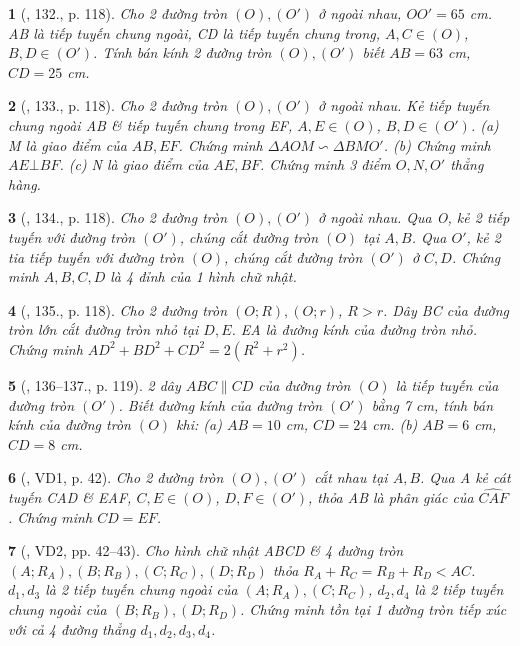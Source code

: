 \documentclass{article}
\newtheorem{baitoan}{}
\begin{document}
\begin{baitoan}[\cite{Binh_Toan_9_tap_1}, 132., p. 118]
	Cho 2 đường tròn $(O),(O')$ ở ngoài nhau, $OO' = 65$ {\rm cm}. AB là tiếp tuyến chung ngoài, CD là tiếp tuyến chung trong, $A,C\in(O)$, $B,D\in(O')$. Tính bán kính 2 đường tròn $(O),(O')$ biết $AB = 63$ {\rm cm}, $CD = 25$ {\rm cm}.
\end{baitoan}

\begin{baitoan}[\cite{Binh_Toan_9_tap_1}, 133., p. 118]
	Cho 2 đường tròn $(O),(O')$ ở ngoài nhau. Kẻ tiếp tuyến chung ngoài AB \& tiếp tuyến chung trong EF, $A,E\in(O)$, $B,D\in(O')$. (a) M là giao điểm của $AB,EF$. Chứng minh $\Delta AOM\backsim\Delta BMO'$. (b) Chứng minh $AE\bot BF$. (c) N là giao điểm của $AE,BF$. Chứng minh 3 điểm $O,N,O'$ thẳng hàng.
\end{baitoan}

\begin{baitoan}[\cite{Binh_Toan_9_tap_1}, 134., p. 118]
	Cho 2 đường tròn $(O),(O')$ ở ngoài nhau. Qua O, kẻ 2 tiếp tuyến với đường tròn $(O')$, chúng cắt đường tròn $(O)$ tại $A,B$. Qua $O'$, kẻ 2 tia tiếp tuyến với đường tròn $(O)$, chúng cắt đường tròn $(O')$ ở $C,D$. Chứng minh $A,B,C,D$ là 4 đỉnh của 1 hình chữ nhật.
\end{baitoan}

\begin{baitoan}[\cite{Binh_Toan_9_tap_1}, 135., p. 118]
	Cho 2 đường tròn $(O;R),(O;r)$, $R > r$. Dây BC của đường tròn lớn cắt đường tròn nhỏ tại $D,E$. EA là đường kính của đường tròn nhỏ. Chứng minh $AD^2 + BD^2 + CD^2 = 2(R^2 + r^2)$.
\end{baitoan}

\begin{baitoan}[\cite{Binh_Toan_9_tap_1}, 136--137., p. 119]
	2 dây $ABC\parallel CD$ của đường tròn $(O)$ là tiếp tuyến của đường tròn $(O')$. Biết đường kính của đường tròn $(O')$ bằng {\rm7 cm}, tính bán kính của đường tròn $(O)$ khi: (a) $AB = 10$ {\rm cm}, $CD = 24$ {\rm cm}. (b) $AB = 6$ {\rm cm}, $CD = 8$ {\rm cm}.
\end{baitoan}

\begin{baitoan}[\cite{TLCT_THCS_Toan_9_hinh_hoc}, VD1, p. 42]
	Cho 2 đường tròn $(O),(O')$ cắt nhau tại $A,B$. Qua A kẻ cát tuyến CAD \& EAF, $C,E\in(O)$, $D,F\in(O')$, thỏa AB là phân giác của $\widehat{CAF}$. Chứng minh $CD = EF$.
\end{baitoan}

\begin{baitoan}[\cite{TLCT_THCS_Toan_9_hinh_hoc}, VD2, pp. 42--43]
	Cho hình chữ nhật ABCD \& 4 đường tròn $(A;R_A),(B;R_B),(C;R_C),(D;R_D)$ thỏa $R_A + R_C = R_B + R_D < AC$. $d_1,d_3$ là 2 tiếp tuyến chung ngoài của $(A;R_A),(C;R_C)$, $d_2,d_4$ là 2 tiếp tuyến chung ngoài của $(B;R_B),(D;R_D)$. Chứng minh tồn tại 1 đường tròn tiếp xúc với cả 4 đường thẳng $d_1,d_2,d_3,d_4$.
\end{baitoan}
\end{document}
